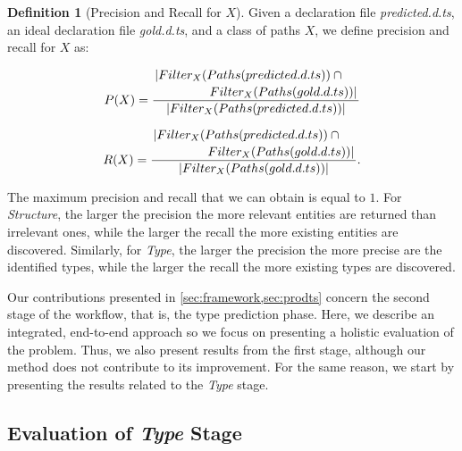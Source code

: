 \documentclass[sigplan,10pt,review,anonymous]{acmart} %
\theoremstyle{plain}
\theoremstyle{remark}
\theoremstyle{definition}
\newtheorem{defn}{Definition}[section]
\begin{document}
\begin{defn}[Precision and Recall for $X$] \label{def:precision_recall}
  Given a declaration file \textit{predicted.d.ts},
  an ideal declaration file \textit{gold.d.ts}, and a class of paths $X$,
  we define precision and recall for $X$ as:

  \begin{equation}
    P(X) =
    \dfrac{\splitdfrac{|Filter_X(Paths(predicted.d.ts)) \cap {}}{Filter_X(Paths(gold.d.ts)) |}}{|Filter_X(Paths(predicted.d.ts)) |}
  \end{equation}
  
  \begin{equation}
    R(X) =
    \dfrac{\splitdfrac{|Filter_X(Paths(predicted.d.ts)) \cap {}} {Filter_X(Paths(gold.d.ts)) |}}
    {|Filter_X(Paths(gold.d.ts))|}.
  \end{equation}
\end{defn}

The maximum precision and recall that we can obtain is equal to $1$.
%
For \textit{Structure}, the larger the precision the more relevant entities are returned than irrelevant ones,
while the larger the recall the more existing entities are discovered.
%
Similarly, for \textit{Type}, the larger the precision the more precise are the identified types,
while the larger the recall the more existing types are discovered.

Our contributions presented in \cref{sec:framework,sec:prodts} concern the second stage of the workflow,
that is, the type prediction phase.
%
Here, we describe an integrated, end-to-end approach so we focus on presenting a holistic evaluation of the problem.
%
Thus, we also present results from the first stage,
although our method does not contribute to its improvement. 
%
For the same reason, we start by presenting the results related to the \textit{Type} stage.

\subsection{Evaluation of \textit{Type} Stage}
\end{document}
